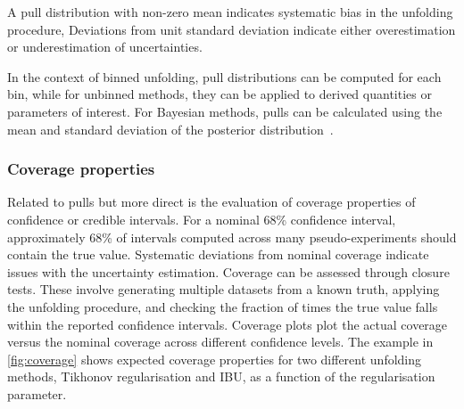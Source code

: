             A pull distribution with non-zero mean indicates systematic bias in the unfolding procedure,
            Deviations from unit standard deviation indicate either overestimation or underestimation of uncertainties.
            
            In the context of binned unfolding, pull distributions can be computed for each bin, while for unbinned methods, they can be applied to derived quantities or parameters of interest.
            For Bayesian methods, pulls can be calculated using the mean and standard deviation of the posterior distribution~\cite{Knapik2012BayesianPriors}.
        \subsubsection{Coverage properties}
            Related to pulls but more direct is the evaluation of coverage properties of confidence or credible intervals.
            For a nominal 68\% confidence interval, approximately 68\% of intervals computed across many pseudo-experiments should contain the true value.
            Systematic deviations from nominal coverage indicate issues with the uncertainty estimation.
            Coverage can be assessed through closure tests. These involve generating multiple datasets from a known truth, applying the unfolding procedure, and checking the fraction of times the true value falls within the reported confidence intervals.
            Coverage plots plot the actual coverage versus the nominal coverage across different confidence levels.
            The example in \cref{fig:coverage} shows expected coverage properties for two different unfolding methods, Tikhonov regularisation and IBU, as a function of the regularisation parameter.

